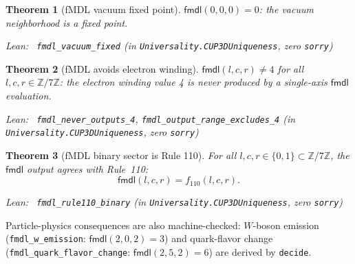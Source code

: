\documentclass[11pt,a4paper]{article}
\newenvironment{leanref}%
  {\par\smallskip\noindent\begingroup\raggedright\textup{Lean:}~}%
  {\par\endgroup}
\newtheorem{theorem}{Theorem}[section]
\theoremstyle{definition}
\begin{document}
\begin{theorem}[fMDL vacuum fixed point]\label{thm:fmdl-vacuum}
$\mathsf{fmdl}(0,0,0) = 0$: the vacuum neighborhood is a fixed point.

\begin{leanref}
\lstinline|fmdl_vacuum_fixed|
\textup{(in \texttt{Universality.CUP3DUniqueness}, zero \texttt{sorry})}
\end{leanref}
\end{theorem}

\begin{theorem}[fMDL avoids electron winding]\label{thm:fmdl-no-4}
$\mathsf{fmdl}(l,c,r) \ne 4$ for all $l,c,r \in \mathbb{Z}/7\mathbb{Z}$: the electron
winding value 4 is never produced by a single-axis $\mathsf{fmdl}$ evaluation.

\begin{leanref}
\lstinline|fmdl_never_outputs_4|, \lstinline|fmdl_output_range_excludes_4|
\textup{(in \texttt{Universality.CUP3DUniqueness}, zero \texttt{sorry})}
\end{leanref}
\end{theorem}

\begin{theorem}[fMDL binary sector is Rule 110]\label{thm:fmdl-rule110}
For all $l,c,r \in \{0,1\} \subset \mathbb{Z}/7\mathbb{Z}$, the $\mathsf{fmdl}$ output
agrees with Rule~110:
\[
  \mathsf{fmdl}(l,c,r) = f_{110}(l,c,r).
\]

\begin{leanref}
\lstinline|fmdl_rule110_binary|
\textup{(in \texttt{Universality.CUP3DUniqueness}, zero \texttt{sorry})}
\end{leanref}
\end{theorem}

Particle-physics consequences are also machine-checked: $W$-boson emission
(\lstinline|fmdl_w_emission|: $\mathsf{fmdl}(2,0,2) = 3$) and quark-flavor change
(\lstinline|fmdl_quark_flavor_change|: $\mathsf{fmdl}(2,5,2) = 6$) are derived
by \texttt{decide}.
\end{document}
